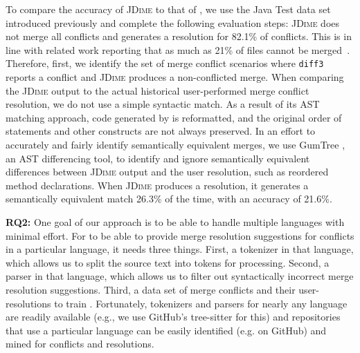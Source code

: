 To compare the accuracy of \textsc{JDime} to that of \thistool{}, we use the Java Test data set introduced previously and complete the following evaluation steps: \textsc{JDime} does not merge all conflicts and generates a resolution for 82.1\% of conflicts. This is in line with related work reporting that as much as 21\% of files cannot be merged~\cite{apel2012structured}. Therefore, first, we identify the set of merge conflict scenarios where \texttt{diff3} reports a conflict and \textsc{JDime} produces a non-conflicted merge. 
When comparing the \textsc{JDime} output to the actual historical user-performed merge conflict resolution, we do not use a simple syntactic match.  As a result of its AST matching approach, code generated by \jdime{} is reformatted, and the original order of statements and other constructs are not always preserved. 
In an effort to accurately and fairly identify semantically equivalent merges, we use GumTree \cite{FalleriMBMM14}, an AST differencing tool, to identify and ignore semantically equivalent differences between \textsc{JDime} output and the user resolution, such as reordered method declarations. When \textsc{JDime} produces a resolution, it generates a semantically equivalent match 26.3\% of the time, with an accuracy of 21.6\%. 

\noindent \textbf{RQ\scriptsize{2}: }\textbf{\rqTwo}
One goal of our approach is to be able to handle multiple languages with minimal effort.  For \thistool{} to be able to provide merge resolution suggestions for conflicts in a particular language, it needs three things.  First, a tokenizer in that language, which allows us to split the source text into tokens for processing.  Second, a parser in that language, which allows us to filter out syntactically incorrect merge resolution suggestions. Third, a data set of merge conflicts and their user-resolutions to train \thistool{}.  Fortunately, tokenizers and parsers for nearly any language are readily available (e.g., we use GitHub's tree-sitter for this) and repositories that use a particular language can be easily identified (e.g. on GitHub) and mined for conflicts and resolutions.

